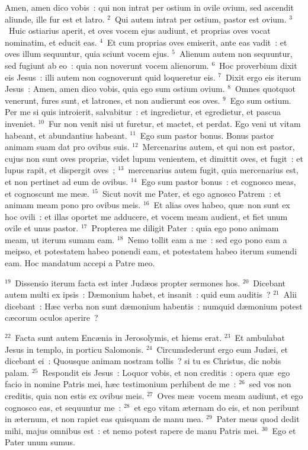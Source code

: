 \lettrine[lines=3,image=true,loversize=0.05,lraise=-0.03]{A}{}men, amen dico vobis~: qui non intrat per ostium in ovile ovium, sed ascendit aliunde, ille fur est et latro.
${}^{2}$~Qui autem intrat per ostium, pastor est ovium.
${}^{3}$~Huic ostiarius aperit, et oves vocem ejus audiunt, et proprias oves vocat nominatim, et educit eas.
${}^{4}$~Et cum proprias oves emiserit, ante eas vadit~: et oves illum sequuntur, quia sciunt vocem ejus.
${}^{5}$~Alienum autem non sequuntur, sed fugiunt ab eo~: quia non noverunt vocem alienorum.
${}^{6}$~Hoc proverbium dixit eis Jesus~: illi autem non cognoverunt quid loqueretur eis.
${}^{7}$~Dixit ergo eis iterum Jesus~: Amen, amen dico vobis, quia ego sum ostium ovium.
${}^{8}$~Omnes quotquot venerunt, fures sunt, et latrones, et non audierunt eos oves.
${}^{9}$~Ego sum ostium. Per me si quis introierit, salvabitur~: et ingredietur, et egredietur, et pascua inveniet.
${}^{10}$~Fur non venit nisi ut furetur, et mactet, et perdat. Ego veni ut vitam habeant, et abundantius habeant.
${}^{11}$~Ego sum pastor bonus. Bonus pastor animam suam dat pro ovibus suis.
${}^{12}$~Mercenarius autem, et qui non est pastor, cujus non sunt oves propri\ae , videt lupum venientem, et dimittit oves, et fugit~: et lupus rapit, et dispergit oves~;
${}^{13}$~mercenarius autem fugit, quia mercenarius est, et non pertinet ad eum de ovibus.
${}^{14}$~Ego sum pastor bonus~: et cognosco meas, et cognoscunt me me\ae .
${}^{15}$~Sicut novit me Pater, et ego agnosco Patrem~: et animam meam pono pro ovibus meis.
${}^{16}$~Et alias oves habeo, qu\ae\ non sunt ex hoc ovili~: et illas oportet me adducere, et vocem meam audient, et fiet unum ovile et unus pastor.
${}^{17}$~Propterea me diligit Pater~: quia ego pono animam meam, ut iterum sumam eam.
${}^{18}$~Nemo tollit eam a me~: sed ego pono eam a meipso, et potestatem habeo ponendi eam, et potestatem habeo iterum sumendi eam. Hoc mandatum accepi a Patre meo.


${}^{19}$~Dissensio iterum facta est inter Jud\ae os propter sermones hos.
${}^{20}$~Dicebant autem multi ex ipsis~: D\ae monium habet, et insanit~: quid eum auditis~?
${}^{21}$~Alii dicebant~: H\ae c verba non sunt d\ae monium habentis~: numquid d\ae monium potest c\ae corum oculos aperire~?


${}^{22}$~Facta sunt autem Enc\ae nia in Jerosolymis, et hiems erat.
${}^{23}$~Et ambulabat Jesus in templo, in porticu Salomonis.
${}^{24}$~Circumdederunt ergo eum Jud\ae i, et dicebant ei~: Quousque animam nostram tollis~? si tu es Christus, dic nobis palam.
${}^{25}$~Respondit eis Jesus~: Loquor vobis, et non creditis~: opera qu\ae\ ego facio in nomine Patris mei, h\ae c testimonium perhibent de me~:
${}^{26}$~sed vos non creditis, quia non estis ex ovibus meis.
${}^{27}$~Oves me\ae\ vocem meam audiunt, et ego cognosco eas, et sequuntur me~:
${}^{28}$~et ego vitam \ae ternam do eis, et non peribunt in \ae ternum, et non rapiet eas quisquam de manu mea.
${}^{29}$~Pater meus quod dedit mihi, majus omnibus est~: et nemo potest rapere de manu Patris mei.
${}^{30}$~Ego et Pater unum sumus.


